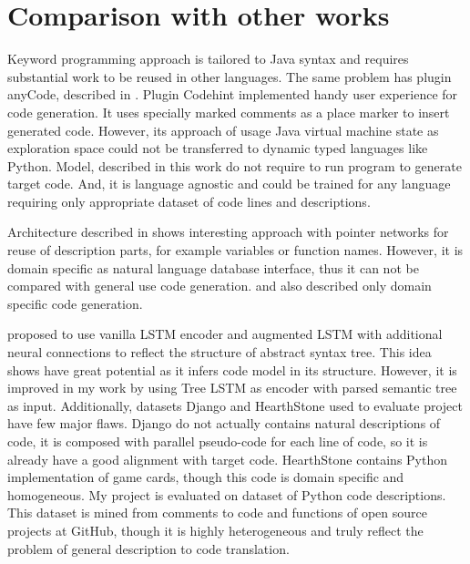 \section{Comparison with other works}

Keyword programming approach \parencite{little2009keyword} is tailored to Java syntax and requires substantial work to be reused in other languages. The same problem has plugin anyCode, described in \cite{Gvero2015}. Plugin Codehint \parencite{Galenson2014} implemented handy user experience for code generation. It uses specially marked comments as a place marker to insert generated code. However, its approach of usage Java virtual machine state as exploration space could not be transferred to dynamic typed languages like Python. Model, described in this work do not require to run program to generate target code. And, it is language agnostic and could be trained for any language requiring only appropriate dataset of code lines and descriptions.

Architecture described in \cite{Zhong2017} shows interesting approach with pointer networks for reuse of description parts, for example variables or function names. However, it is domain specific as natural language database interface, thus it can not be compared with general use code generation. \cite{Chen2016} and \cite{Ling2016} also described only domain specific code generation.

\cite{Yin2017} proposed to use vanilla LSTM encoder and augmented LSTM with additional neural connections to reflect the structure of abstract syntax tree. This idea shows have great potential as it infers code model in its structure. However, it is improved in my work by using Tree LSTM as encoder with parsed semantic tree as input.  Additionally, datasets Django and HearthStone used to evaluate \cite{Yin2017} project have few major flaws. Django do not actually contains natural descriptions of code, it is composed with parallel pseudo-code for each line of code, so it is already have a good alignment with target code. HearthStone contains Python implementation of game cards, though this code is domain specific and homogeneous. My project is evaluated on \cite{Barone2017} dataset of Python code descriptions. This dataset is mined from comments to code and functions of open source projects at GitHub, though it is highly heterogeneous and truly reflect the problem of general description to code translation.

